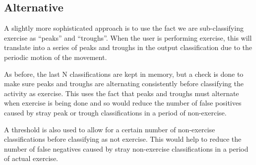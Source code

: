 \subsection{Alternative \label{sec:heuristics-alternative}}
A slightly more sophisticated approach is to use the fact we are sub-classifying exercise as “peaks” and “troughs”. When the user is performing exercise, this will translate into a series of peaks and troughs in the output classification due to the periodic motion of the movement.

As before, the last N classifications are kept in memory, but a check is done to make sure peaks and troughs are alternating consistently before classifying the activity as exercise. This uses the fact that peaks and troughs must alternate when exercise is being done and so would reduce the number of false positives caused by stray peak or trough classifications in a period of non-exercise. 

A threshold is also used to allow for a certain number of non-exercise classifications before classifying as not exercise. This would help to reduce the number of false negatives caused by stray non-exercise classifications in a period of actual exercise.

